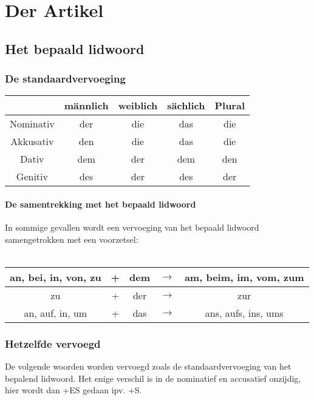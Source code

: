 \documentclass[main.tex]{subfiles}
\begin{document}
\chapter{Der Artikel}
\section{Het bepaald lidwoord}
\subsection{De standaardvervoeging}
\begin{tabular}{|c|c|c|c|c|}
\hline 
\rowcolor{gray}
 & männlich & weiblich & sächlich & Plural \\ 
\hline 
\cellcolor[gray]{0.8}Nominativ & der & die & das & die \\ 
\hline 
\cellcolor[gray]{0.8}Akkusativ & den & die & das & die \\ 
\hline 
\cellcolor[gray]{0.8}Dativ & dem & der & dem & den \\ 
\hline 
\cellcolor[gray]{0.8}Genitiv & des & der & des & der \\ 
\hline 
\end{tabular} 
\subsubsection{De samentrekking met het bepaald lidwoord}
In sommige gevallen wordt een vervoeging van het bepaald lidwoord samengetrokken met een voorzetsel:
\\
\\
\begin{tabular}{ccccc}
an, bei, in, von, zu & + & dem & $\rightarrow$ & am, beim, im, vom, zum \\ 
\hline 
zu & + & der & $\rightarrow$ & zur \\ 
\hline 
an, auf, in, um & + & das & $\rightarrow$ & ans, aufs, ins, ums \\ 
\end{tabular} 
\subsection{Hetzelfde vervoegd}

De volgende woorden worden vervoegd zoals de standaardvervoeging van het bepalend lidwoord. Het enige verschil is in de nominatief en accusatief onzijdig, hier wordt dan +ES gedaan ipv. +S.
\end{document}
